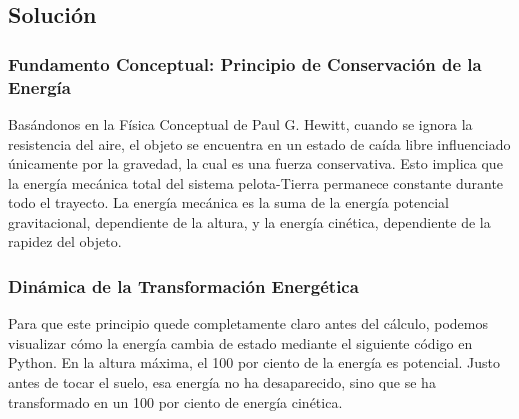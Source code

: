 \documentclass[12pt,a4paper]{article}
\begin{document}
\begin{center}
\end{center}

\subsection*{Solución}

\subsubsection*{Fundamento Conceptual: Principio de Conservación de la Energía}
Basándonos en la Física Conceptual de Paul G. Hewitt, cuando se ignora la resistencia del aire, el objeto se encuentra en un estado de caída libre influenciado únicamente por la gravedad, la cual es una fuerza conservativa. Esto implica que la energía mecánica total del sistema pelota-Tierra permanece constante durante todo el trayecto. La energía mecánica es la suma de la energía potencial gravitacional, dependiente de la altura, y la energía cinética, dependiente de la rapidez del objeto. 

\subsubsection*{Dinámica de la Transformación Energética}
Para que este principio quede completamente claro antes del cálculo, podemos visualizar cómo la energía cambia de estado mediante el siguiente código en Python. En la altura máxima, el 100 por ciento de la energía es potencial. Justo antes de tocar el suelo, esa energía no ha desaparecido, sino que se ha transformado en un 100 por ciento de energía cinética.
\end{document}
